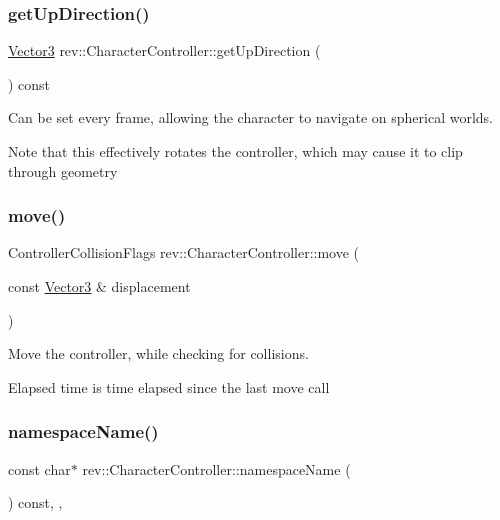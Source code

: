 \subsubsection{\texorpdfstring{getUpDirection()}{getUpDirection()}}
{\footnotesize\ttfamily \mbox{\hyperlink{classrev_1_1_vector}{Vector3}} rev\+::\+Character\+Controller\+::get\+Up\+Direction (\begin{DoxyParamCaption}{ }\end{DoxyParamCaption}) const\hspace{0.3cm}{\ttfamily [inline]}}



Can be set every frame, allowing the character to navigate on spherical worlds. 

Note that this effectively rotates the controller, which may cause it to clip through geometry \mbox{\label{classrev_1_1_character_controller_ae36c3695f38bc82cce6e96478879719b}} 
\subsubsection{\texorpdfstring{move()}{move()}}
{\footnotesize\ttfamily Controller\+Collision\+Flags rev\+::\+Character\+Controller\+::move (\begin{DoxyParamCaption}\item[{const \mbox{\hyperlink{classrev_1_1_vector}{Vector3}} \&}]{displacement }\end{DoxyParamCaption})}



Move the controller, while checking for collisions. 

Elapsed time is time elapsed since the last move call \mbox{\label{classrev_1_1_character_controller_ae897d2d65e41a9dea75dc32e69577b8e}} 
\subsubsection{\texorpdfstring{namespaceName()}{namespaceName()}}
{\footnotesize\ttfamily const char$\ast$ rev\+::\+Character\+Controller\+::namespace\+Name (\begin{DoxyParamCaption}{ }\end{DoxyParamCaption}) const\hspace{0.3cm}{\ttfamily [inline]}, {\ttfamily [override]}, {\ttfamily [virtual]}}




